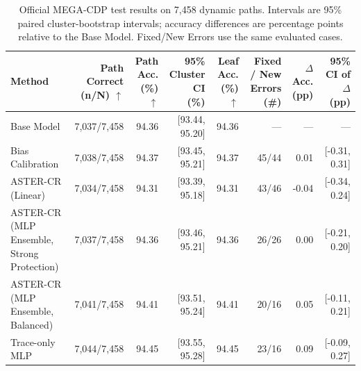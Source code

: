\begin{table}[t]
\centering
\small
\setlength{\tabcolsep}{3pt}
\begin{tabularx}{\textwidth}{@{}>{\raggedright\arraybackslash}Xrrrrrrr@{}}
\toprule
Method & \shortstack{Path Correct\\ (n/N) $\uparrow$} & \shortstack{Path Acc.\\ (\%) $\uparrow$} & \shortstack{95\% Cluster CI\\ (\%)} & \shortstack{Leaf Acc.\\ (\%) $\uparrow$} & \shortstack{Fixed / New Errors\\ (\#)} & \shortstack{$\Delta$Acc.\\ (pp)} & \shortstack{95\% CI of $\Delta$\\ (pp)} \\
\midrule
Base Model & 7,037/7,458 & 94.36 & [93.44, 95.20] & 94.36 & — & — & — \\
Bias Calibration & 7,038/7,458 & 94.37 & [93.45, 95.21] & 94.37 & 45/44 & 0.01 & [-0.31, 0.31] \\
ASTER-CR (Linear) & 7,034/7,458 & 94.31 & [93.39, 95.18] & 94.31 & 43/46 & -0.04 & [-0.34, 0.24] \\
ASTER-CR (MLP Ensemble, Strong Protection) & 7,037/7,458 & 94.36 & [93.46, 95.21] & 94.36 & 26/26 & 0.00 & [-0.21, 0.20] \\
ASTER-CR (MLP Ensemble, Balanced) & 7,041/7,458 & 94.41 & [93.51, 95.24] & 94.41 & 20/16 & 0.05 & [-0.11, 0.21] \\
Trace-only MLP & 7,044/7,458 & 94.45 & [93.55, 95.28] & 94.45 & 23/16 & 0.09 & [-0.09, 0.27] \\
\bottomrule
\end{tabularx}
\caption{Official MEGA-CDP test results on 7,458 dynamic paths. Intervals are 95\% paired cluster-bootstrap intervals; accuracy differences are percentage points relative to the Base Model. Fixed/New Errors use the same evaluated cases.}
\label{tab:aster-main-04}
\end{table}

